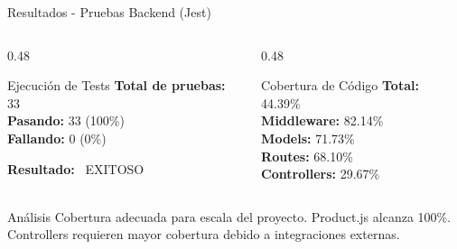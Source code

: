 \documentclass[aspectratio=169]{beamer}
\begin{document}
\begin{frame}{Resultados - Pruebas Backend (Jest)}
\begin{columns}[T]
\begin{column}{0.48\textwidth}
\begin{block}{Ejecución de Tests}
\textbf{Total de pruebas:} 33 \\
\textbf{Pasando:} \textcolor{successgreen}{33 (100\%)} \\
\textbf{Fallando:} \textcolor{darktext}{0 (0\%)}
\end{block}

\vspace{0.3cm}

\textbf{Resultado:} \textcolor{successgreen}{\faCheckCircle~EXITOSO}
\end{column}

\begin{column}{0.48\textwidth}
\begin{block}{Cobertura de Código}
\textbf{Total:} 44.39\% \\
\textbf{Middleware:} 82.14\% \\
\textbf{Models:} 71.73\% \\
\textbf{Routes:} 68.10\% \\
\textbf{Controllers:} 29.67\%
\end{block}
\end{column}
\end{columns}

\vspace{0.5cm}

\begin{alertblock}{Análisis}
Cobertura adecuada para escala del proyecto. Product.js alcanza 100\%. Controllers requieren mayor cobertura debido a integraciones externas.
\end{alertblock}
\end{frame}
\end{document}
